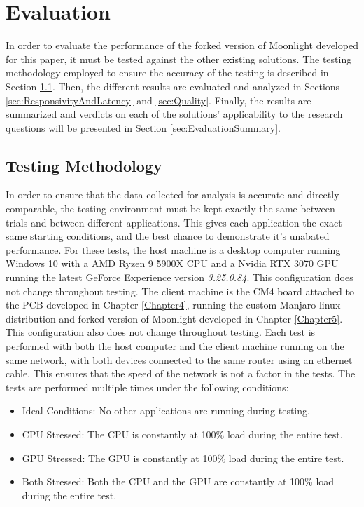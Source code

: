 \chapter{Evaluation}

\label{Chapter6}

In order to evaluate the performance of the forked version of Moonlight developed for this paper, it must be tested against the other existing solutions.
The testing methodology employed to ensure the accuracy of the testing is described in Section \ref{sec:TestingMethodology}.
Then, the different results are evaluated and analyzed in Sections \ref{sec:ResponsivityAndLatency} and \ref{sec:Quality}.
Finally, the results are summarized and verdicts on each of the solutions' applicability to the research questions will be presented in Section \ref{sec:EvaluationSummary}.


\section{Testing Methodology}\label{sec:TestingMethodology}

In order to ensure that the data collected for analysis is accurate and directly comparable, the testing environment must be kept exactly the same between trials and between different applications.
This gives each application the exact same starting conditions, and the best chance to demonstrate it's unabated performance.
For these tests, the host machine is a desktop computer running Windows 10 with a AMD Ryzen 9 5900X CPU and a Nvidia RTX 3070 GPU running the latest GeForce Experience version \emph{3.25.0.84}.
This configuration does not change throughout testing.
The client machine is the CM4 board attached to the PCB developed in Chapter \ref{Chapter4}, running the custom Manjaro linux distribution and forked version of Moonlight developed in Chapter \ref{Chapter5}.
This configuration also does not change throughout testing.
Each test is performed with both the host computer and the client machine running on the same network, with both devices connected to the same router using an ethernet cable.
This ensures that the speed of the network is not a factor in the tests.
The tests are performed multiple times under the following conditions:

\begin{itemize}
  \item Ideal Conditions: No other applications are running during testing.
  \item CPU Stressed: The CPU is constantly at 100\% load during the entire test.
  \item GPU Stressed: The GPU is constantly at 100\% load during the entire test.
  \item Both Stressed: Both the CPU and the GPU are constantly at 100\% load during the entire test.
\end{itemize}

